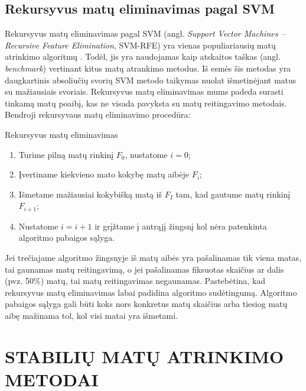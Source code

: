 \subsection{Rekursyvus matų eliminavimas pagal SVM}

Rekursyvus matų eliminavimas pagal SVM (angl. \textit{Support Vector Machines -- Recursive Feature Elimination}, SVM-RFE) yra vienas populiariausių matų atrinkimo algoritmų \cite{guyon2002gene}. Todėl, jis yra naudojamas kaip atskaitos taškas (angl. \textit{benchmark}) vertinant kitus matų atrankimo metodus. Iš esmės šis metodas yra daugkartinis absoliučių svorių SVM metodo taikymas nuolat išmetinėjant matus su mažiausiais svoriais. Rekursyvus matų eliminavimas mums padeda surasti tinkamą matų poaibį, kas ne visada pavyksta su matų reitingavimo metodais. Bendroji rekursyvaus matų eliminavimo procedūra:
\begin{algorithm}
\caption{Rekursyvus matų eliminavimas}
\label{RFE}
 \begin{enumerate}
 \item Turime pilną matų rinkinį $F_0$, nustatome $i=0$;
 \item Įvertiname kiekvieno mato kokybę matų aibėje $F_i$;
 \item Išmetame mažiausiai kokybišką matą iš $F_I$ tam, kad gautume matų rinkinį $F_{i+1}$;
 \item Nustatome $i=i+1$ ir grįžtame į antrąjį žingsnį kol nėra patenkinta algoritmo pabaigos sąlyga.
\end{enumerate}
\end{algorithm}
Jei trečiajame algoritmo žingsnyje iš matų aibės yra pašalinamas tik viena matas, tai gaunamas matų reitingavimą, o jei pašalinamas fiksuotas skaičius ar dalis (pvz. 50\%) matų, tai matų reitingavimas negaunamas. Pastebėtina, kad rekursyvus matų eliminavimas labai padidina algoritmo sudėtingumą. Algoritmo pabaigos sąlyga gali būti koks nors konkretus matų skaičius arba tiesiog matų aibę mažinama tol, kol visi matai yra išmetami.

\newpage
\section{STABILIŲ MATŲ ATRINKIMO METODAI}
\label{stabiliu_matu_atrinkimo_metodai}

